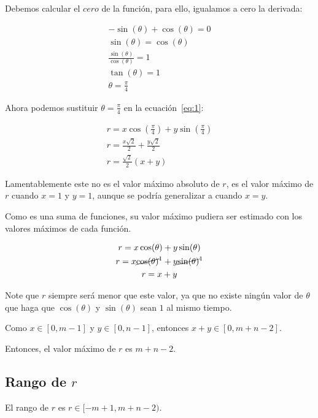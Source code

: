 \documentclass[11pt]{article}
\begin{document}
    Debemos calcular el $cero$ de la función, para ello, igualamos a cero la derivada:

    \begin{gather*}
        - \sin(\theta) + \cos(\theta) = 0\\
        \sin(\theta) = \cos(\theta)\\
        \frac{\sin(\theta)}{\cos(\theta)} = 1\\
        \tan(\theta) = 1\\
        \theta = \frac{\pi}{4}
    \end{gather*}

    Ahora podemos sustituir $\theta = \frac{\pi}{4}$ en la ecuación~\ref{eq:1}:

    \begin{gather*}
        r = x \cos(\frac{\pi}{4}) + y \sin(\frac{\pi}{4})\\
        r = \frac{x \sqrt{2}}{2} + \frac{y \sqrt{2}}{2}\\
        r = \frac{\sqrt{2}}{2} (x + y)
    \end{gather*}

    Lamentablemente este no es el valor máximo absoluto de $r$, es el valor máximo de $r$ cuando $x = 1$ y $y = 1$,
    aunque se podría generalizar a cuando $x = y$.

    Como es una suma de funciones, su valor máximo pudiera ser estimado con los valores máximos de cada función.

    \begin{gather*}
        r = x \cos(\theta) + y \sin(\theta)\\
        r = x \cancel{\cos(\theta)}^1 + y \cancel{\sin(\theta)}^1\\
        r = x + y
    \end{gather*}

    Note que $r$ siempre será menor que este valor, ya que no existe ningún valor de $\theta$ que haga que $\cos(\theta)$ y $\sin(\theta)$ sean $1$ al mismo tiempo.

    Como $x \in [0, m-1]$ y $y \in [0, n-1]$, entonces $x + y \in [0, m + n - 2]$.

    Entonces, el valor máximo de $r$ es $m + n - 2$.


    \subsection{Rango de $r$}\label{subsec:rango_r}

    El rango de $r$ es $ r \in [-m+1, m + n - 2)$.
\end{document}
